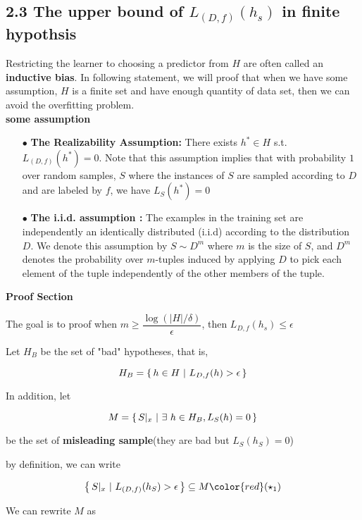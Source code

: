 \subsection*{2.3 The upper bound of $L_{(D,f)}(h_s)$ in finite hypothsis} $ $\\

Restricting the learner to choosing a predictor from $H$ are often called an \textbf{inductive bias}. In following statement, we will proof that when we have some assumption, $H$ is a finite set and have enough quantity of data set, then we can avoid the overfitting problem. \\

\textbf{some assumption}

\begin{enumerate}
	\item[$\bullet$] \textbf{The Realizability Assumption:} There exists $h^* \in H$ s.t. $L_{(D,f)}(h^*) = 0$. Note that this assumption implies that with probability $1$ over random samples, $S$ where the instances of $S$ are sampled according to $D$ and are labeled by $f$, we have $L_S(h^*) = 0$
	\item[$\bullet$] \textbf{The i.i.d. assumption :} The examples in the training set are independently an identically distributed (i.i.d) according to the distribution $D$. We denote this assumption by $S \sim D^m$ where $m$ is the size of $S$, and $D^m$ denotes the probability over $m$-tuples induced by applying $D$ to pick each element of the tuple independently of the other members of the tuple.
\end{enumerate}

\textbf{Proof Section}

The goal is to proof when $m \geq \dfrac{\log(|H|/\delta)}{\epsilon}$, then $L_{D,f}(h_s) \leq \epsilon$

Let $H_B$ be the set of "bad" hypotheses, that is,

$$H_B = \left\{ \,h \in H~|~L_{D,f}(h)>\epsilon \,\right\}$$

In addition, let

$$M = \left\{ \,S|_x ~|~ \exists~h \in H_B,L_S(h) = 0 \,\right\}$$

be the set of \textbf{misleading sample}(they are bad but $L_S(h_S) = 0$)

\newpage

by definition, we can write 

$$\sett{S|_x ~|~ L_{(D,f)}(h_S) > \epsilon} \subseteq M\color{red}(\star_1) $$


We can rewrite $M$ as 

